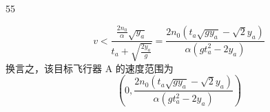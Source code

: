 \begin{solution}{55}
\begin{subsolution}
\begin{equation}
v < \frac{\frac{2n_{0}}{\alpha}\sqrt{y_{a}}}{t_{a} + \sqrt{\frac{2y_{a}}{g}}} = \frac{2n_{0}(t_{a}\sqrt{gy_{a}} - \sqrt{2}y_{a})}{\alpha(gt_{a}^{2} - 2y_{a})}
\label{eq:24.s55}
\end{equation}
换言之，该目标飞行器 A 的速度范围为
\begin{equation}
\left(0, \frac{2n_{0}(t_{a}\sqrt{gy_{a}} - \sqrt{2}y_{a})}{\alpha(gt_{a}^{2} - 2y_{a})}\right)
\label{eq:25.s55}
\end{equation}
\end{subsolution}
\end{solution}